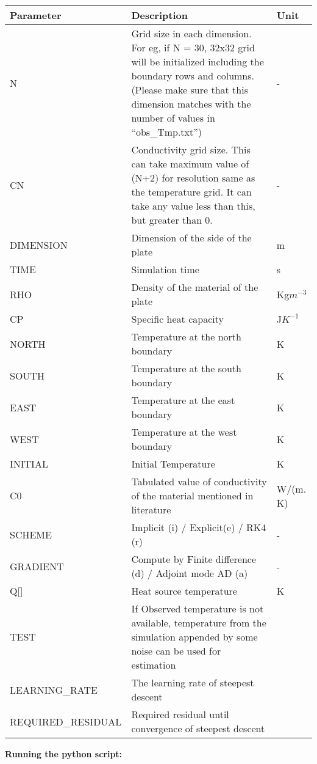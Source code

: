 \documentclass[10pt,a4paper]{report}
\begin{document}
\begin{appendices}
\begin{tabular}{ | m{10.5em} | m{7cm}| m{0.95cm} | } 
\hline
\textbf{Parameter} & \textbf{Description} & \textbf{Unit}\\ 
\hline
N& Grid size in each dimension. For eg, if N = 30, 32x32 grid will be initialized including the boundary rows and columns. (Please make sure that this dimension matches with the number of values in “obs\_Tmp.txt”) & - \\ 
\hline
CN & Conductivity grid size. This can take maximum value of (N+2) for resolution same as the temperature grid. It can take any value less than this, but greater than 0. & - \\ 
\hline
DIMENSION & Dimension of the side of the plate & m \\ 
\hline
TIME & Simulation time & s\\
\hline
RHO & Density of the material of the plate & Kg$m^{-3}$\\
\hline
CP & Specific heat capacity & J$K^{-1}$\\
\hline
NORTH & Temperature at the north boundary & K\\
\hline
SOUTH & Temperature at the south boundary & K\\
\hline
EAST & Temperature at the east boundary & K\\
\hline
WEST & Temperature at the west boundary & K\\
\hline
INITIAL & Initial Temperature & K\\
\hline
C0 & Tabulated value of conductivity of the material mentioned in literature & W/(m. K)\\
\hline
SCHEME & Implicit (i) / Explicit(e) / RK4 (r) & -\\
\hline
GRADIENT & Compute by Finite difference (d) / Adjoint mode AD (a) & -\\
\hline
Q[] & Heat source temperature & K\\
\hline
TEST & If Observed temperature is not available, temperature from the simulation appended by some noise can be used for estimation & \\
\hline
LEARNING\_RATE & The learning rate of steepest descent & \\
\hline
REQUIRED\_RESIDUAL & Required residual until convergence of steepest descent & \\
\hline

\end{tabular}
\newpage

\textbf{Running the python script:}\\


\end{appendices}
\end{document}
